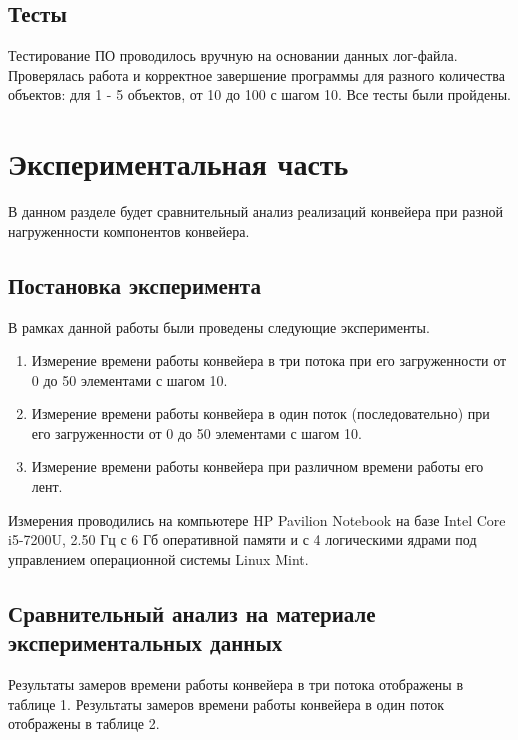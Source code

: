 \documentclass[a4paper,14pt]{report}
\begin{document}
\section*{Тесты}

Тестирование ПО проводилось вручную на основании данных лог-файла. Проверялась работа и корректное завершение программы для разного количества объектов: для 1 - 5 объектов, от 10 до 100 с шагом 10. Все тесты были пройдены.

\chapter*{Экспериментальная часть}

В данном разделе будет сравнительный анализ реализаций конвейера при разной нагруженности компонентов конвейера.

\section*{Постановка эксперимента}

В рамках данной работы были проведены следующие эксперименты.

\begin{enumerate}
	\item Измерение времени работы конвейера в три потока при его загруженности от 0 до 50 элементами с шагом 10.
	\item Измерение времени работы конвейера в один поток (последовательно) при его загруженности от 0 до 50 элементами с шагом 10.
	\item Измерение времени работы конвейера при различном времени работы его лент.
\end{enumerate}

Измерения проводились на компьютере HP Pavilion Notebook на базе Intel Core i5-7200U, 2.50 Гц с 6 Гб оперативной памяти и с 4 логическими ядрами под управлением операционной системы Linux Mint.

\section*{Сравнительный анализ на материале экспериментальных данных}

Результаты замеров времени работы конвейера в три потока отображены в таблице 1. Результаты замеров времени работы конвейера в один поток отображены в таблице 2.
\end{document}
